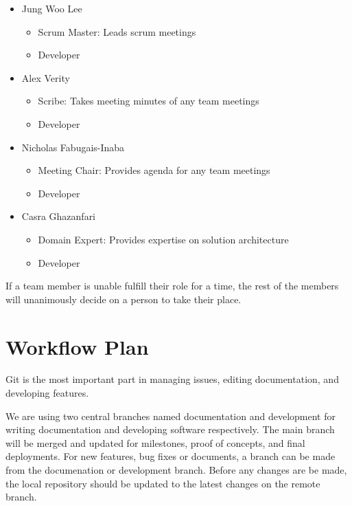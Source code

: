 \documentclass{article}
\begin{document}
\begin{itemize}
	\item Jung Woo Lee
	\begin{itemize}
	  \item Scrum Master: Leads scrum meetings
	  \item Developer
  \end{itemize}
	\item Alex Verity
  \begin{itemize}
    \item Scribe: Takes meeting minutes of any team meetings
	  \item Developer
  \end{itemize}
  \item Nicholas Fabugais-Inaba
  \begin{itemize}
    \item Meeting Chair: Provides agenda for any team meetings
	  \item Developer
  \end{itemize}
  \item Casra Ghazanfari
  \begin{itemize}
    \item Domain Expert: Provides expertise on solution architecture
	  \item Developer
  \end{itemize}
\end{itemize}

If a team member is unable fulfill their role for a time, the rest of the members will
unanimously decide on a person to take their place. 

\section{Workflow Plan}

Git is the most important part in managing issues, editing documentation, and developing features.
\newline

We are using two central branches named documentation and development for writing documentation
and developing software respectively.
The main branch will be merged and updated for milestones, proof of concepts, and
final deployments.
For new features, bug fixes or documents, a branch can be made from the documenation or development branch.
Before any changes are be made, the local repository should be updated to the latest changes on
the remote branch.\newline
\end{document}
